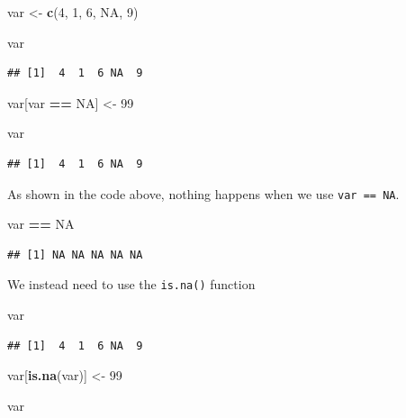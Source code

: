 \documentclass[
]{book}
\newenvironment{Shaded}{\begin{snugshade}}{\end{snugshade}}
\newcommand{\ConstantTok}[1]{\textcolor[rgb]{0.56,0.35,0.01}{#1}}
\newcommand{\DecValTok}[1]{\textcolor[rgb]{0.00,0.00,0.81}{#1}}
\newcommand{\FunctionTok}[1]{\textcolor[rgb]{0.13,0.29,0.53}{\textbf{#1}}}
\newcommand{\NormalTok}[1]{#1}
\newcommand{\OtherTok}[1]{\textcolor[rgb]{0.56,0.35,0.01}{#1}}
\newcommand{\SpecialCharTok}[1]{\textcolor[rgb]{0.81,0.36,0.00}{\textbf{#1}}}
\begin{document}
\begin{Shaded}
\begin{Highlighting}[]
\NormalTok{var }\OtherTok{\textless{}{-}} \FunctionTok{c}\NormalTok{(}\DecValTok{4}\NormalTok{, }\DecValTok{1}\NormalTok{, }\DecValTok{6}\NormalTok{, }\ConstantTok{NA}\NormalTok{, }\DecValTok{9}\NormalTok{)}

\NormalTok{var}
\end{Highlighting}
\end{Shaded}

\begin{verbatim}
## [1]  4  1  6 NA  9
\end{verbatim}

\begin{Shaded}
\begin{Highlighting}[]
\NormalTok{var[var }\SpecialCharTok{==} \ConstantTok{NA}\NormalTok{] }\OtherTok{\textless{}{-}} \DecValTok{99}

\NormalTok{var}
\end{Highlighting}
\end{Shaded}

\begin{verbatim}
## [1]  4  1  6 NA  9
\end{verbatim}

As shown in the code above, nothing happens when we use \texttt{var\ ==\ NA}.

\begin{Shaded}
\begin{Highlighting}[]
\NormalTok{var }\SpecialCharTok{==} \ConstantTok{NA}
\end{Highlighting}
\end{Shaded}

\begin{verbatim}
## [1] NA NA NA NA NA
\end{verbatim}

We instead need to use the \texttt{is.na()} function

\begin{Shaded}
\begin{Highlighting}[]
\NormalTok{var}
\end{Highlighting}
\end{Shaded}

\begin{verbatim}
## [1]  4  1  6 NA  9
\end{verbatim}

\begin{Shaded}
\begin{Highlighting}[]
\NormalTok{var[}\FunctionTok{is.na}\NormalTok{(var)] }\OtherTok{\textless{}{-}} \DecValTok{99}

\NormalTok{var}
\end{Highlighting}
\end{Shaded}
\end{document}
